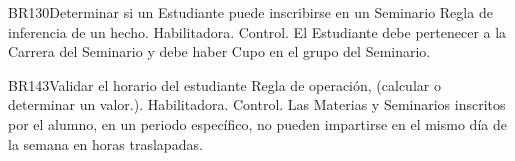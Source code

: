 \begin{BussinesRule}{BR130}{Determinar si un Estudiante puede inscribirse en un Seminario}
	\BRitem[Tipo:] Regla de inferencia de un hecho.
	\BRitem[Clase:] Habilitadora. 
	\BRitem[Nivel:] Control. %
	\BRitem[Descripción:] El Estudiante debe pertenecer a la Carrera del Seminario y debe haber Cupo en el grupo del Seminario.
	
	
\end{BussinesRule}

\begin{BussinesRule}{BR143}{Validar el horario del estudiante}
	\BRitem[Tipo:] Regla de operación, (calcular o determinar un valor.).
	\BRitem[Clase:] Habilitadora. 
	\BRitem[Nivel:] Control. %
	\BRitem[Descripción:] Las Materias y Seminarios inscritos por el alumno, en un periodo específico, no pueden impartirse en el mismo día de la semana en horas traslapadas.
	
	
\end{BussinesRule}

